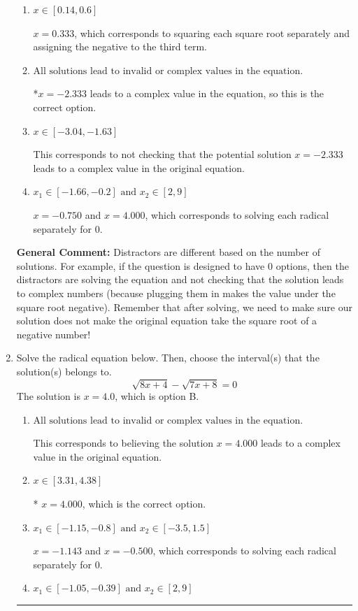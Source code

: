 \documentclass{extbook}[14pt]
\newcommand{\litem}[1]{\item #1

\rule{\textwidth}{0.4pt}}
\begin{document}
\begin{enumerate}
{\begin{enumerate}[label=\Alph*.]
$x = -2.333$ and $x = -0.750$, which corresponds to solving the equation correctly and including the value that makes the first square root 0.
\item \( x \in [0.14,0.6] \)

$x = 0.333$, which corresponds to squaring each square root separately and assigning the negative to the third term.
\item \( \text{All solutions lead to invalid or complex values in the equation.} \)

*$x = -2.333$ leads to a complex value in the equation, so this is the correct option.
\item \( x \in [-3.04,-1.63] \)

This corresponds to not checking that the potential solution $x = -2.333$ leads to a complex value in the original equation.
\item \( x_1 \in [-1.66, -0.2] \text{ and } x_2 \in [2,9] \)

$x = -0.750$ and $x = 4.000$, which corresponds to solving each radical separately for 0.
\end{enumerate}

\textbf{General Comment:} Distractors are different based on the number of solutions. For example, if the question is designed to have 0 options, then the distractors are solving the equation and not checking that the solution leads to complex numbers (because plugging them in makes the value under the square root negative). Remember that after solving, we need to make sure our solution does not make the original equation take the square root of a negative number!
}
\litem{
Solve the radical equation below. Then, choose the interval(s) that the solution(s) belongs to.
\[ \sqrt{8 x + 4} - \sqrt{7 x + 8} = 0 \]The solution is \( x = 4.0 \), which is option B.\begin{enumerate}[label=\Alph*.]
\item \( \text{All solutions lead to invalid or complex values in the equation.} \)

This corresponds to believing the solution $x = 4.000$ leads to a complex value in the original equation.
\item \( x \in [3.31,4.38] \)

* $x = 4.000$, which is the correct option.
\item \( x_1 \in [-1.15, -0.8] \text{ and } x_2 \in [-3.5,1.5] \)

$x = -1.143$ and $x = -0.500$, which corresponds to solving each radical separately for 0.
\item \( x_1 \in [-1.05, -0.39] \text{ and } x_2 \in [2,9] \)


\end{enumerate}}
\end{enumerate}
\end{document}
